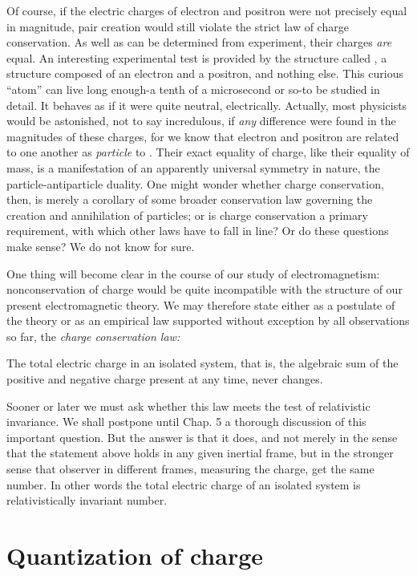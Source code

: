 Of course, if the electric charges of electron and positron
were not precisely equal in magnitude, pair creation would still violate the
strict law of charge conservation. As well as can be determined from
experiment, their charges \emph{are} equal. An interesting experimental test is
provided by the structure called , a structure composed of an
electron and a positron, and nothing else. This curious ``atom'' can live long
enough-a tenth of a microsecond or so-to be studied in detail. It behaves as if
it were quite neutral, electrically. Actually, most physicists would be
astonished, not to say incredulous, if \emph{any} difference were found in the
magnitudes of these charges, for we know that electron and positron are related
to one another as \emph{particle} to . Their exact equality
of charge, like their equality of mass, is a manifestation of an apparently
universal symmetry in nature, the particle-antiparticle duality. One might
wonder whether charge conservation, then, is merely a corollary of some broader
conservation law governing the creation and annihilation of particles; or is
charge conservation a primary requirement, with which other laws have to fall
in line? Or do these questions make sense? We do not know for sure. 

One thing will become clear in the course of our study of
electromagnetism: nonconservation of charge would be quite incompatible with
the structure of our present electromagnetic theory. We may therefore state
either as a postulate of the theory or as an empirical law supported without
exception by all observations so far, the \emph{charge conservation law:}

The total electric charge in an isolated system, that is, the
algebraic sum of the positive and negative charge present at any time, never
changes. 

Sooner or later we must ask whether this law meets the test
of relativistic invariance. We shall postpone until Chap. 5 a thorough
discussion of this important question. But the answer is that it does, and not
merely in the sense that the statement above holds in any given inertial frame,
but in the stronger sense that observer in different frames, measuring the
charge, get the same number. In other words the total electric charge of an
isolated system is relativistically invariant number. 

\section{Quantization of charge}

